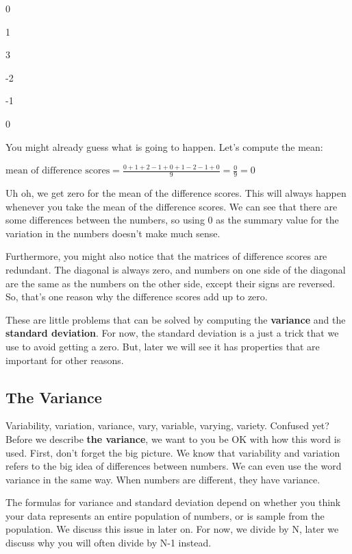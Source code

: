 \documentclass[]{book}
\newenvironment{marginnote}%
  {\itshape}%
  {}
\begin{document}
0

1

3

-2

-1

0

You might already guess what is going to happen. Let's compute the mean:

\(\text{mean of difference scores} = \frac{0+1+2-1+0+1-2-1+0}{9} = \frac{0}{9} = 0\)

Uh oh, we get zero for the mean of the difference scores. This will always happen whenever you take the mean of the difference scores. We can see that there are some differences between the numbers, so using 0 as the summary value for the variation in the numbers doesn't make much sense.

Furthermore, you might also notice that the matrices of difference scores are redundant. The diagonal is always zero, and numbers on one side of the diagonal are the same as the numbers on the other side, except their signs are reversed. So, that's one reason why the difference scores add up to zero.

These are little problems that can be solved by computing the \textbf{variance} and the \textbf{standard deviation}. For now, the standard deviation is a just a trick that we use to avoid getting a zero. But, later we will see it has properties that are important for other reasons.

\hypertarget{the-variance}{%
\subsection{The Variance}\label{the-variance}}

Variability, variation, variance, vary, variable, varying, variety. Confused yet? Before we describe \textbf{the variance}, we want to you be OK with how this word is used. First, don't forget the big picture. We know that variability and variation refers to the big idea of differences between numbers. We can even use the word variance in the same way. When numbers are different, they have variance.

\begin{marginnote}

The formulas for variance and standard deviation depend on whether you think your data represents an entire population of numbers, or is sample from the population. We discuss this issue in later on. For now, we divide by N, later we discuss why you will often divide by N-1 instead.

\end{marginnote}
\end{document}
